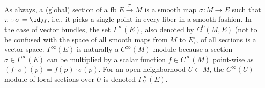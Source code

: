 \begin{defn}
    As always, a (global) section of a \gls{fb} $E\overset{\pi}{\to}M$ is a smooth map $\sigma:M\to E$ such that $\pi\circ \sigma=\id_M$, i.e., it picks a single point in every fiber in a smooth fashion. In the case of vector bundles, the set $\Gamma^\infty(E)$, also denoted by $\Omega^0(M,E)$ (not to be confused with the space of all smooth maps from $M$ to $E$), of all sections is a vector space. $\Gamma^\infty(E)$ is naturally a $C^\infty(M)$-module because a section $\sigma\in\Gamma^\infty(E)$ can be multiplied by a scalar function $f\in C^\infty(M)$ point-wise as $(f\cdot\sigma)(p)=f(p)\cdot\sigma(p)$. For an open neighborhood $U\subset M$, the $C^\infty(U)$-module of local sections over $U$ is denoted $\Gamma^\infty_U(E)$.
\end{defn}


